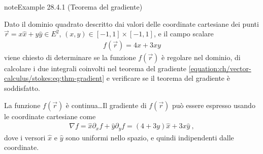 \documentclass[letterpaper,10pt,italian]{jupyterBook}
\begin{document}
\begin{sphinxadmonition}{note}{Example 28.4.1 (Teorema del gradiente)}



\sphinxAtStartPar
Dato il dominio quadrato descritto dai valori delle coordinate cartesiane dei punti \(\vec{r} = x \hat{x} + y \hat{y} \in E^2\), \((x, y) \in [-1, 1] \times [-1,1]\), e il campo scalare
\begin{equation*}
\begin{split}f(\vec{r}) = 4 x + 3 x y\end{split}
\end{equation*}
\sphinxAtStartPar
viene chiesto di determinare se la funzione \(f(\vec{r})\) è regolare nel dominio, di calcolare i due integrali coinvolti nel teorema del gradiente \eqref{equation:ch/vector-calculus/stokes:eq:thm-gradient} e verificare se il teorema del gradiente è soddisfatto.

\sphinxAtStartPar
La funzione \(f(\vec{r})\) è continua…Il gradiente di \(f(\vec{r})\) può essere espresso usando le coordinate cartesiane come
\begin{equation*}
\begin{split}\nabla f = \hat{x} \partial_x f + \hat{y} \partial_y f = (4 + 3 y) \hat{x} + 3 x \hat{y} \ ,\end{split}
\end{equation*}
\sphinxAtStartPar
dove i versori \(\hat{x}\) e \(\hat{y}\) sono uniformi nello spazio, e quindi indipendenti dalle coordinate.


\end{sphinxadmonition}
\end{document}
